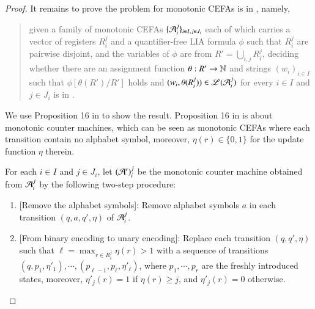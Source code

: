 \begin{proof}
\smallskip

It remains to prove the {\lasat} problem for monotonic CEFAs is in {\pspace}, namely,
\begin{quote}
given a family of monotonic CEFAs $\{ \mathcal{A}_i^{j} \}_{i\in I,j\in J_i}$ each of which carries a vector of registers $R_i^j$ and a quantifier-free LIA formula $\phi$ such that  $ R_i^{j} $ are pairwise disjoint,  and the variables of $\phi$ are from $R'=\bigcup_{i,j} R_i^j$, deciding whether  there are an assignment function $\theta: R' \rightarrow \mathbb{N}$ and strings $(w_i)_{i \in I}$ such that  $\phi[\theta(R' )/R']$ holds and $(w_i, \theta(R_i^j)) \in \mathscr{L}(\mathcal{A}_{i}^j)$ for every $i \in I$ and $j \in J_i$ is in {\pspace}.
\end{quote}


We use Proposition 16 in \cite{LB16} to show the result. Proposition 16 in \cite{LB16} is about monotonic counter machines, which can be seen as monotonic CEFAs where each transition contain no alphabet symbol, moreover, $\eta(r) \in \{0,1\}$ for the update function $\eta$ therein.

For each $i\in I$ and $j\in J_i$, let $(\mathcal{A}')_i^j$ be the monotonic counter machine obtained from $\mathcal{A}_i^{j}$ by the following two-step procedure:
\begin{enumerate}
\item {[Remove the alphabet symbols]}: Remove alphabet symbols $a$ in each transition $(q, a, q', \eta)$ of $\mathcal{A}_i^{j}$.
%
\item {[From binary encoding to unary encoding]}: Replace each transition $(q, q', \eta)$ such that $\ell = \max_{r \in R_i^j} \eta(r) > 1$ with a sequence of transitions $(q, p_1,\eta'_1), \cdots, (p_{\ell-1}, p_\ell, \eta'_\ell)$, where $p_1, \cdots,p_r$ are the freshly introduced states, moreover, $\eta'_j(r) = 1$ if $\eta(r) \ge j$, and $\eta'_j(r)=0$ otherwise. 
\end{enumerate}


\end{proof}
